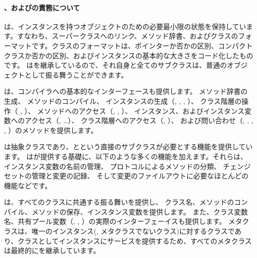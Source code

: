 \documentclass[a4paper,10pt,twoside]{book}
\begin{document}

\paragraph{、およびの責務について}
は、インスタンスを持つオブジェクトのための必要最小限の状態を保持しています。すなわち、スーパークラスへのリンク、メソッド辞書、およびクラスのフォーマットです。クラスのフォーマットは、ポインターか否かの区別、コンパクトクラスか否かの区別、およびインスタンスの基本的な大きさをコード化したものです。
はを継承しているので、それ自身と全てのサブクラスは、普通のオブジェクトとして振る舞うことができます。

は、コンパイラへの基本的なインターフェースも提供します。
メソッド辞書の生成、
メソッドのコンパイル、
インスタンスの生成（\ie {}, , , ）、
クラス階層の操作（\ie {} , ）、
メソッドへのアクセス（\ie {}, , ）、
インスタンス、およびインスタンス変数へのアクセス（\ie {}, \ldots）、
クラス階層へのアクセス（\ie {}, ）、
および問い合わせ（\ie {}, , , , ）のメソッドを提供します。


は抽象クラスであり、とという直接のサブクラスが必要とする機能を提供しています。
はが提供する基礎に、以下のような多くの機能を加えます。それらは、
インスタンス変数の名前の管理、
プロトコルによるメソッドの分類、
チェンジセットの管理と変更の記録、
そして変更のファイルアウトに必要なほとんどの機能などです。

は、すべてのクラスに共通する振る舞いを提供し、
クラス名、メソッドのコンパイル、メソッドの保存、インスタンス変数を提供します。
また、クラス変数名、共有プール変数（, , ）の実際のインターフェーイスも提供します。
メタクラスは、唯一のインスタンス(\ie, メタクラスでないクラス)に対するクラスであり、クラスとしてインスタンスにサービスを提供するため、すべてのメタクラスは最終的にを継承しています。
\end{document}
